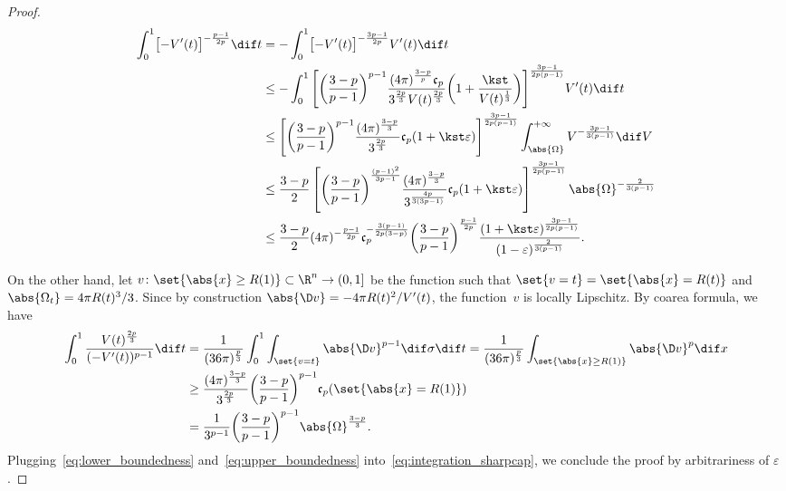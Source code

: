 \documentclass[10pt,a4paper]{amsart}
\numberwithin{equation}{section}
\renewcommand{\ncapa}{\mathfrak{c}}
\begin{document}
\begin{proof}
\begin{align}
 \int_0^1\bigl[-V'(t)\bigr]^{-\frac{p-1}{2p}}\dif t&{}=-\int_0^1\bigl[-V'(t)\bigr]^{-\frac{3p-1}{2p}}V'(t)\dif t \nonumber\\
 &{} \leq-\int_0^1\Bigg[ \bigg( \frac{3-p}{p-1}\bigg)^{p-1} \frac{(4\pi)^{\frac{3-p}{p}}\ncapa_p}{3^{\frac{2p}{3}} V(t)^{\frac{2p}{3}}}\bigg(1+ \frac{\kst}{V(t)^{\frac{1}{3}}}\bigg)\Bigg]^{\frac{3p-1}{2p(p-1)}} V'(t) \dif t \nonumber\\
 &{}\leq\Bigg[\bigg(\frac{3-p}{p-1}\bigg)^{p-1}\frac{(4 \pi )^{\frac{3-p}{3}}}{3^{\frac{2p}{3}}}\ncapa_p(1+\kst \varepsilon)\Bigg]^{\frac{3p-1}{2p(p-1)}}\int_{\abs{\Omega}}^{+\infty} V^{-\frac{3p-1}{3(p-1)}} \dif V \nonumber\\
 &{}\leq\frac{3-p}{2}\left[\bigg(\frac{3-p}{p-1}\bigg)^{\frac{(p-1)^2}{3p-1}}\frac{(4 \pi )^{\frac{3-p}{3}}}{3^{\frac{4p}{3(3p-1)}}}\ncapa_p(1+\kst \varepsilon)\right]^{\frac{3p-1}{2p(p-1)}} \abs{\Omega}^{-\frac{2}{3(p-1)}} \nonumber\\
 &{}\leq \frac{3-p}{2}(4 \pi )^{-\frac{p-1}{2p}} \ncapa_p^{-\frac{3(p-1)}{2p(3-p)}} \bigg(\frac{3-p}{p-1}\bigg)^{\frac{p-1}{2p}}\frac{(1+ \kst \varepsilon)^{\frac{3p-1}{2p(p-1)}}}{ (1-\varepsilon)^{\frac{2}{3(p-1)}}}.\label{eq:upper_boundedness}
\end{align}

On the other hand, let $v\colon \set{ \abs{x} \geq R(1)} \subset \R^n \to (0,1]$ be the function such that $\set{v=t}= \set{\abs{x}=R(t)}$ and $\abs{\Omega_t}=4 \pi R(t)^3/3$.
Since by construction $\abs{\D v}= -4 \pi R(t)^{2}/V'(t)$, the function~$v$ is locally Lipschitz. By coarea formula, we have
\begin{align}
 \int_0^1 \frac{V(t)^{\frac{2p}{3}}}{(-V'(t))^{p-1}} \dif t &{}= \frac{1}{(36 \pi )^{\frac{p}{3}}}\int_0^1 { \int_{\set{v=t}} \abs{\D v}^{p-1} \dif \sigma} \dif t = \frac{1}{(36 \pi )^{\frac{p}{3}}} \int_{\set{ \abs{x}\geq R(1)}} \abs{\D v}^p\dif x \nonumber\\
 &{}\geq \frac{(4\pi)^{\frac{3-p}{3}}}{3^{\frac{2p}{3}}}\bigg(\frac{3-p}{p-1}\bigg)^{p-1} \ncapa_p(\set{\abs{x}=R(1)}) \nonumber\\
 &{}=\frac{1}{3^{p-1}}\bigg(\frac{3-p}{p-1}\bigg)^{p-1} \abs{\Omega}^{\frac{3-p}{3}}.\label{eq:lower_boundedness}
\end{align}
Plugging~\eqref{eq:lower_boundedness} and~\eqref{eq:upper_boundedness} into~\eqref{eq:integration_sharpcap}, we conclude the proof by arbitrariness of $\varepsilon$. \end{proof}
\end{document}
